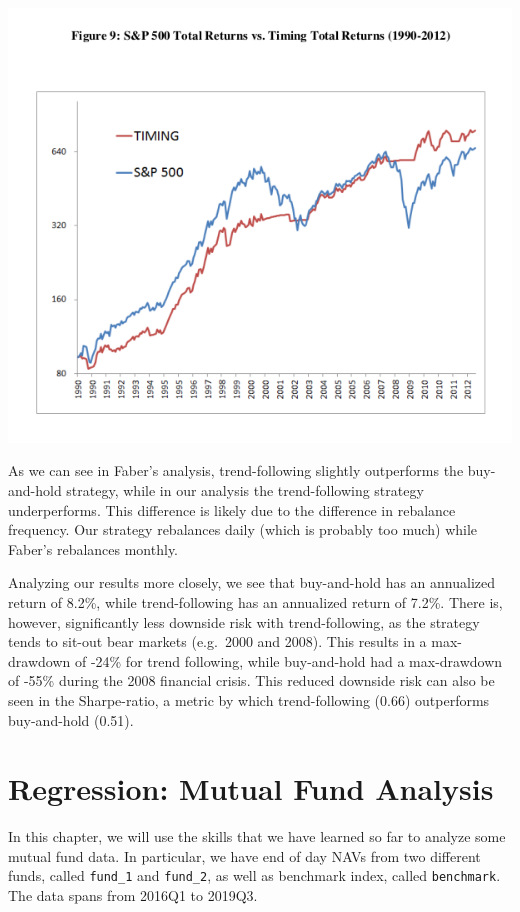 \documentclass[
  letterpaper,
  DIV=11,
  numbers=noendperiod]{scrreprt}
\begin{document}
\includegraphics{chapters/16_trend_following/images/meb_faber_equity_graph.png}

As we can see in Faber's analysis, trend-following slightly outperforms
the buy-and-hold strategy, while in our analysis the trend-following
strategy underperforms. This difference is likely due to the difference
in rebalance frequency. Our strategy rebalances daily (which is probably
too much) while Faber's rebalances monthly.

Analyzing our results more closely, we see that buy-and-hold has an
annualized return of 8.2\%, while trend-following has an annualized
return of 7.2\%. There is, however, significantly less downside risk
with trend-following, as the strategy tends to sit-out bear markets
(e.g.~2000 and 2008). This results in a max-drawdown of -24\% for trend
following, while buy-and-hold had a max-drawdown of -55\% during the
2008 financial crisis. This reduced downside risk can also be seen in
the Sharpe-ratio, a metric by which trend-following (0.66) outperforms
buy-and-hold (0.51).

\hypertarget{regression-mutual-fund-analysis}{%
\chapter{Regression: Mutual Fund
Analysis}\label{regression-mutual-fund-analysis}}

In this chapter, we will use the skills that we have learned so far to
analyze some mutual fund data. In particular, we have end of day NAVs
from two different funds, called \texttt{fund\_1} and \texttt{fund\_2},
as well as benchmark index, called \texttt{benchmark}. The data spans
from 2016Q1 to 2019Q3.
\end{document}
